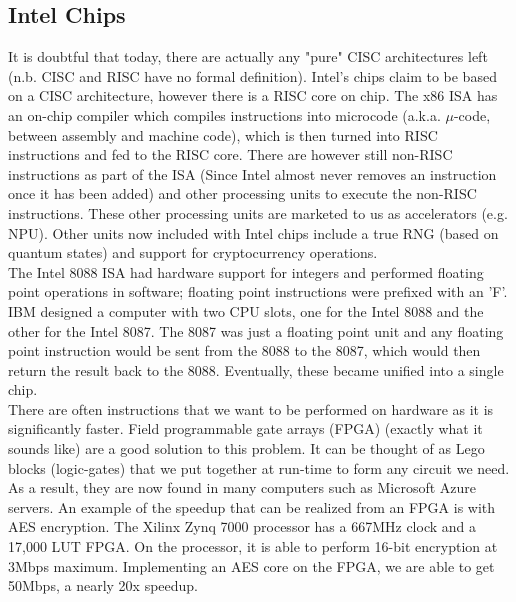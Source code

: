 \documentclass[10pt]{article}
\begin{document}
\subsection{Intel Chips}
It is doubtful that today, there are actually any "pure" CISC architectures left (n.b. CISC and RISC have no formal definition). Intel's chips claim to be based on a CISC architecture, however there is a RISC core on chip. The x86 ISA has an on-chip compiler which compiles instructions into microcode (a.k.a. $\mu$-code, between assembly and machine code), which is then turned into RISC instructions and fed to the RISC core. There are however still non-RISC instructions as part of the ISA (Since Intel almost never removes an instruction once it has been added) and other processing units to execute the non-RISC instructions. These other processing units are marketed to us as accelerators (e.g. NPU). Other units now included with Intel chips include a true RNG (based on quantum states) and support for cryptocurrency operations.\\
\newline
The Intel 8088 ISA had hardware support for integers and performed floating point operations in software; floating point instructions were prefixed with an 'F'. IBM designed a computer with two CPU slots, one for the Intel 8088 and the other for the Intel 8087. The 8087 was just a floating point unit and any floating point instruction would be sent from the 8088 to the 8087, which would then return the result back to the 8088. Eventually, these became unified into a single chip.\\
\newline
There are often instructions that we want to be performed on hardware as it is significantly faster. Field programmable gate arrays (FPGA) (exactly what it sounds like) are a good solution to this problem. It can be thought of as Lego blocks (logic-gates) that we put together at run-time to form any circuit we need. As a result, they are now found in many computers such as Microsoft Azure servers. An example of the speedup that can be realized from an FPGA is with AES encryption. The Xilinx Zynq 7000 processor has a 667MHz clock and a 17,000 LUT FPGA. On the processor, it is able to perform 16-bit encryption at 3Mbps maximum. Implementing an AES core on the FPGA, we are able to get 50Mbps, a nearly 20x speedup.\\
\newline
\end{document}
